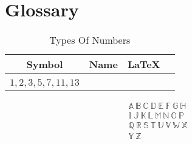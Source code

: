 \chapter{Glossary}
\label{chap:Glossary}

\begin{table}[!htb]
\label{tab:TypesOfNumbers}
\begin{tabularx}{\linewidth}{| c | l | c | X |} \hline
  Symbol & Name & \LaTeX \\
  \hline \hline \\
  $1, 2, 3, 5, 7, 11, 13 $ \\  \hline
\end{tabularx}
\caption{Types Of Numbers}
\end{table}



\begin{align}
  \mathbb{A} ~ \mathbb{B} ~ \mathbb{C} ~ \mathbb{D} ~ \mathbb{E} ~ \mathbb{F} ~ \mathbb{G} ~ \mathbb{H} \\
  \mathbb{I} ~ \mathbb{J} ~ \mathbb{K} ~ \mathbb{L} ~ \mathbb{M} ~ \mathbb{N} ~ \mathbb{O} ~ \mathbb{P} \\
  \mathbb{Q} ~ \mathbb{R} ~ \mathbb{S} ~ \mathbb{T} ~ \mathbb{U} ~ \mathbb{V} ~ \mathbb{W} ~ \mathbb{X} \\
  \mathbb{Y} ~ \mathbb{Z} \\
\end{align}